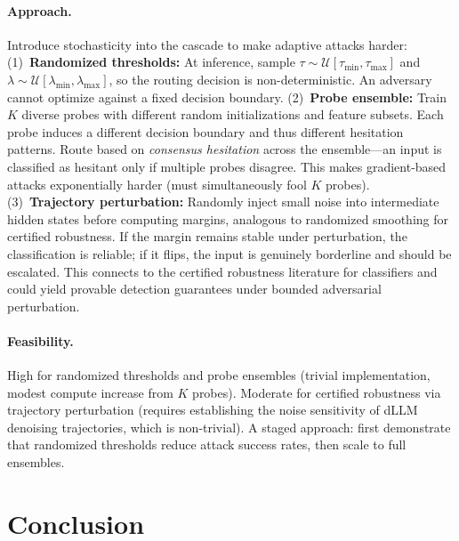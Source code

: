 \documentclass[11pt,a4paper]{article}
\begin{document}
\paragraph{Approach.}
Introduce stochasticity into the cascade to make adaptive attacks harder: (1)~\textbf{Randomized thresholds:} At inference, sample $\tau \sim \mathcal{U}[\tau_{\min}, \tau_{\max}]$ and $\lambda \sim \mathcal{U}[\lambda_{\min}, \lambda_{\max}]$, so the routing decision is non-deterministic. An adversary cannot optimize against a fixed decision boundary. (2)~\textbf{Probe ensemble:} Train $K$ diverse probes with different random initializations and feature subsets. Each probe induces a different decision boundary and thus different hesitation patterns. Route based on \emph{consensus hesitation} across the ensemble---an input is classified as hesitant only if multiple probes disagree. This makes gradient-based attacks exponentially harder (must simultaneously fool $K$ probes). (3)~\textbf{Trajectory perturbation:} Randomly inject small noise into intermediate hidden states before computing margins, analogous to randomized smoothing for certified robustness. If the margin remains stable under perturbation, the classification is reliable; if it flips, the input is genuinely borderline and should be escalated. This connects to the certified robustness literature for classifiers and could yield provable detection guarantees under bounded adversarial perturbation.

\paragraph{Feasibility.}
High for randomized thresholds and probe ensembles (trivial implementation, modest compute increase from $K$ probes). Moderate for certified robustness via trajectory perturbation (requires establishing the noise sensitivity of dLLM denoising trajectories, which is non-trivial). A staged approach: first demonstrate that randomized thresholds reduce attack success rates, then scale to full ensembles.

\section*{Conclusion}
\end{document}
